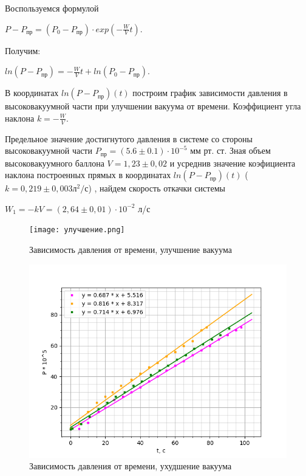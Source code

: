 \documentclass[12pt,a4paper]{article}
\begin{document}
\begin{enumerate}
Воспользуемся формулой
    \begin{center}
    $P - P_{пр}= (P_0 - P_{пр})\cdot exp(-\frac{W}{V}t)$.
    \end{center}
    Получим:
    \begin{center}
    $ln(P - P_{пр}) = -\frac{W}{V}t + ln(P_0 - P_{пр})$.
    \end{center}
    В координатах $ln(P - P_{пр})(t)$ построим график зависимости давления в высоковакуумной части при улучшении вакуума от времени. Коэффициент угла наклона $k = -\frac{W}{V}$. 
    
    Предельное значение достигнутого давления в системе со стороны высоковакуумной части $P_{пр} = (5.6 \pm 0.1) \cdot 10 ^{-5}$ мм рт. ст. Зная объем высоковакуумного баллона $V=1,23\pm0,02 $ и усреднив значение коэфициента наклона построенных прямых в координатах $ln(P - P_{пр})(t) $ ($k=0,219\pm0,003 л^{2}/с$) , найдем скорость откачки системы
    \begin{center}
    
     $W_1 =-kV = (2,64 \pm 0,01)\cdot 10^{-2}$ л/с
    \end{center}
  \begin{figure}[h!]
    \centering
    \texttt{[image: улучшение.png]}
    \caption{Зависимость давления от времени, улучшение вакуума}
\end{figure}

\begin{figure}[h!]
    \centering
    \includegraphics[scale=0.72]{ухудшение.png}
    \caption{Зависимость давления от времени, ухудшение вакуума}
\end{figure}


\end{enumerate}
\end{document}
